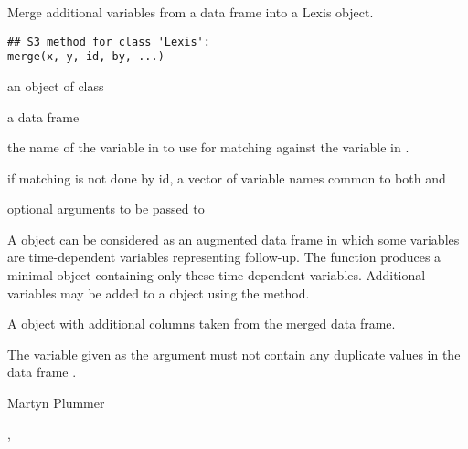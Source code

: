 \begin{Description}\relax
Merge additional variables from a data frame into a Lexis object.
\end{Description}
\begin{Usage}
\begin{verbatim}
## S3 method for class 'Lexis':
merge(x, y, id, by, ...)
\end{verbatim}
\end{Usage}
\begin{Arguments}
\begin{ldescription}
\item[\code{x}] an object of class 
\item[\code{y}] a data frame
\item[\code{id}] the name of the variable in  to use for matching
against the variable  in .

\item[\code{by}] if matching is not done by id, a vector of variable names
common to both  and 
\item[\code{...}] optional arguments to be passed to 
\end{ldescription}
\end{Arguments}
\begin{Details}\relax
A  object can be considered as an augmented data frame
in which some variables are time-dependent variables representing
follow-up. The  function produces a minimal object
containing only these time-dependent variables.  Additional variables
may be added to a  object using the  method.
\end{Details}
\begin{Value}
A  object with additional columns taken from the
merged data frame.
\end{Value}
\begin{Note}\relax
The variable given as the  argument must not contain
any duplicate values in the data frame .
\end{Note}
\begin{Author}\relax
Martyn Plummer
\end{Author}
\begin{SeeAlso}\relax
{}, 
\end{SeeAlso}

